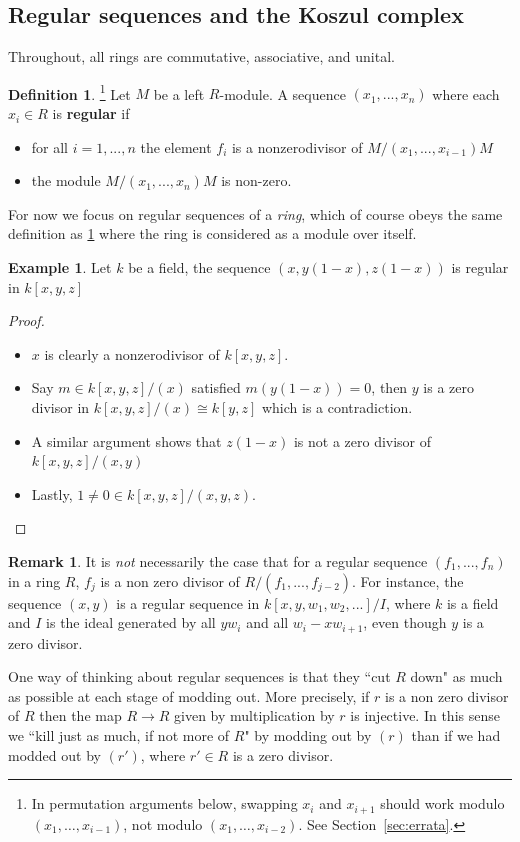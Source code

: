 \documentclass[12pt]{article}
\theoremstyle{plain}
\theoremstyle{definition}
\newtheorem{defn}[thm]{Definition} %
\newtheorem{remark}[thm]{Remark}
\newtheorem{example}[thm]{Example}
\begin{document}
\subsection{Regular sequences and the Koszul complex}
Throughout, all rings are commutative, associative, and unital.
\begin{defn}\label{def:regular_sequence}\footnote{In permutation arguments below, swapping $x_i$ and $x_{i+1}$ should work modulo $(x_1,\ldots,x_{i-1})$, not modulo $(x_1,\ldots,x_{i-2})$. See Section~\ref{sec:errata}.}
Let $M$ be a left $R$-module. A sequence $(x_1,...,x_n)$ where each $x_i \in R$ is \textbf{regular} if
\begin{itemize}
    \item for all $i = 1,...,n$ the element $f_i$ is a nonzerodivisor of $M/(x_1,...,x_{i-1})M$
    \item the module $M/(x_1,...,x_n)M$ is non-zero.
\end{itemize}
\end{defn}
For now we focus on regular sequences of a \emph{ring}, which of course obeys the same definition as \ref{def:regular_sequence} where the ring is considered as a module over itself.
\begin{example}
Let $k$ be a field, the sequence $(x,y(1-x),z(1-x))$ is regular in $k[x,y,z]$
\end{example}
\begin{proof}
\begin{itemize}
    \item $x$ is clearly a nonzerodivisor of $k[x,y,z]$.
    \item Say $m \in k[x,y,z]/(x)$ satisfied $m(y(1-x)) = 0$, then $y$ is a zero divisor in $k[x,y,z]/(x) \cong k[y,z]$ which is a contradiction.
    \item A similar argument shows that $z(1-x)$ is not a zero divisor of $k[x,y,z]/(x,y)$
    \item Lastly, $1 \neq 0 \in k[x,y,z]/(x,y,z)$.
\end{itemize}
\end{proof}
\begin{remark}
It is \emph{not} necessarily the case that for a regular sequence $(f_1,...,f_n)$ in a ring $R$, $f_j$ is a non zero divisor of $R/(f_1,...,f_{j-2})$. For instance, the sequence $(x,y)$ is a regular sequence in $k[x,y,w_1,w_2,...]/I$, where $k$ is a field and $I$ is the ideal generated by all $yw_i$ and all $w_i - xw_{i+1}$, even though $y$ is a zero divisor.
\end{remark}
One way of thinking about regular sequences is that they ``cut $R$ down" as much as possible at each stage of modding out. More precisely, if $r$ is a non zero divisor of $R$ then the map $R \to R$ given by multiplication by $r$ is injective. In this sense we ``kill just as much, if not more of $R$" by modding out by $(r)$ than if we had modded out by $(r')$, where $r' \in R$ is a zero divisor.
\end{document}
